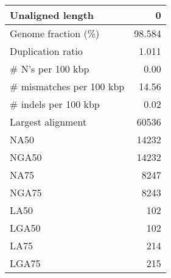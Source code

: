 \documentclass[12pt,a4paper]{article}
\begin{document}
\begin{table}[ht]
\begin{center}
\begin{tabular}{|l*{1}{|r}|}
Unaligned length & 0 \\ \hline
Genome fraction (\%) & 98.584 \\ \hline
Duplication ratio & 1.011 \\ \hline
\# N's per 100 kbp & 0.00 \\ \hline
\# mismatches per 100 kbp & 14.56 \\ \hline
\# indels per 100 kbp & 0.02 \\ \hline
Largest alignment & 60536 \\ \hline
NA50 & 14232 \\ \hline
NGA50 & 14232 \\ \hline
NA75 & 8247 \\ \hline
NGA75 & 8243 \\ \hline
LA50 & 102 \\ \hline
LGA50 & 102 \\ \hline
LA75 & 214 \\ \hline
LGA75 & 215 \\ \hline
\end{tabular}
\end{center}
\end{table}
\end{document}
